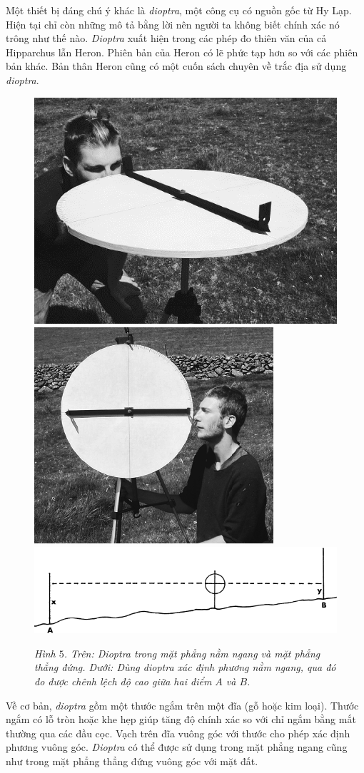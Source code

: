 \begin{multicols}{2}
	\vskip 0.1cm
	Một thiết bị đáng chú ý khác là \textit{dioptra}, một công cụ có nguồn gốc từ Hy Lạp. Hiện tại chỉ còn những mô tả bằng lời nên người ta không biết chính xác nó trông như thế nào. \textit{Dioptra} xuất hiện trong các phép đo thiên văn của cả Hipparchus lẫn Heron. Phiên bản của Heron có lẽ phức tạp hơn so với các phiên bản khác. Bản thân Heron cũng có một cuốn sách chuyên về trắc địa sử dụng \textit{dioptra}.
	\begin{figure}[H]
		\vspace*{-10pt}
		\centering
		\captionsetup{labelformat= empty, justification=centering}
		\includegraphics[height= 0.4\linewidth]{5a}
		\includegraphics[height= 0.4\linewidth]{5b}
		\includegraphics[width= 1\linewidth]{5c}
		\caption{\small\textit{\color{toanhocdoisong}Hình $5$. Trên: Dioptra trong mặt phẳng nằm ngang và mặt phẳng thẳng đứng. Dưới: Dùng dioptra xác định phương nằm ngang, qua đó đo được chênh lệch độ cao giữa hai điểm $A$ và $B$.}}
		\vspace*{-10pt}
	\end{figure}
	Về cơ bản, \textit{dioptra} gồm một thước ngắm trên một đĩa (gỗ hoặc kim loại). Thước ngắm có lỗ tròn hoặc khe hẹp giúp tăng độ chính xác so với chỉ ngắm bằng mắt thường qua các đầu cọc. Vạch trên đĩa vuông góc với thước cho phép xác định phương vuông góc. \textit{Dioptra} có thể được sử dụng trong mặt phẳng ngang cũng như trong mặt phẳng thẳng đứng vuông góc với mặt đất.

\end{multicols}
